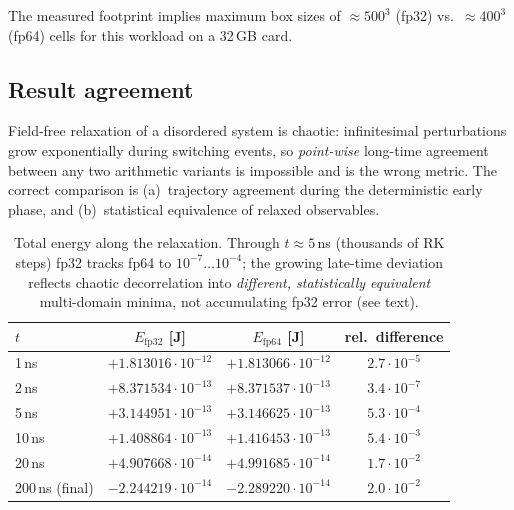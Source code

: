 \documentclass[11pt,a4paper]{article}
\begin{document}
The measured footprint implies maximum box sizes of $\approx 500^3$ (fp32) vs.\
$\approx 400^3$ (fp64) cells for this workload on a 32\,GB card.

\subsection{Result agreement}

Field-free relaxation of a disordered system is chaotic: infinitesimal
perturbations grow exponentially during switching events, so \emph{point-wise}
long-time agreement between any two arithmetic variants is impossible and is the
wrong metric. The correct comparison is (a)~trajectory agreement during the
deterministic early phase, and (b)~statistical equivalence of relaxed
observables.

\begin{table}[h]\centering\small
\begin{tabular}{lccc}
\toprule
$t$ & $E_\mathrm{fp32}$ [J] & $E_\mathrm{fp64}$ [J] & rel.\ difference \\
\midrule
1\,ns  & $+1.813016\cdot10^{-12}$ & $+1.813066\cdot10^{-12}$ & $2.7\cdot10^{-5}$ \\
2\,ns  & $+8.371534\cdot10^{-13}$ & $+8.371537\cdot10^{-13}$ & $3.4\cdot10^{-7}$ \\
5\,ns  & $+3.144951\cdot10^{-13}$ & $+3.146625\cdot10^{-13}$ & $5.3\cdot10^{-4}$ \\
10\,ns & $+1.408864\cdot10^{-13}$ & $+1.416453\cdot10^{-13}$ & $5.4\cdot10^{-3}$ \\
20\,ns & $+4.907668\cdot10^{-14}$ & $+4.991685\cdot10^{-14}$ & $1.7\cdot10^{-2}$ \\
200\,ns (final) & $-2.244219\cdot10^{-14}$ & $-2.289220\cdot10^{-14}$ & $2.0\cdot10^{-2}$ \\
\bottomrule
\end{tabular}
\caption{Total energy along the relaxation. Through $t\approx5$\,ns (thousands of
RK steps) fp32 tracks fp64 to $10^{-7}\dots10^{-4}$; the growing late-time
deviation reflects chaotic decorrelation into \emph{different, statistically
equivalent} multi-domain minima, not accumulating fp32 error (see text).}
\label{tab:energy}
\end{table}
\end{document}
